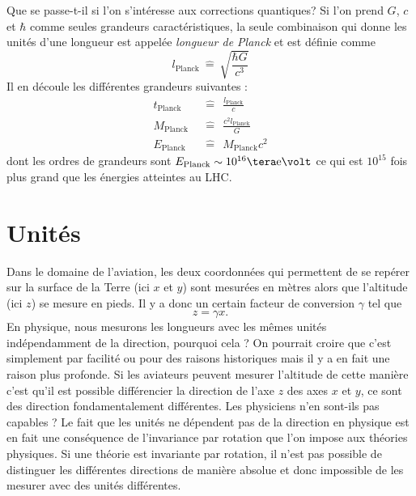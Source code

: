 \documentclass[a4paper,11pt]{report}
\begin{document}
        Que se passe-t-il si l'on s'intéresse aux corrections quantiques? Si l'on prend $G$, $c$ et $\hbar$ comme seules grandeurs caractéristiques, la seule combinaison qui donne les unités d'une longueur est appelée \textit{longueur de Planck} et est définie comme
        \begin{equation*}
            l_{\text{Planck}} ~\hat{=}~ \sqrt{\frac{\hbar G}{c^3}}
        \end{equation*}
        Il en découle les différentes grandeurs suivantes :
        \begin{align*}
            t_{\text{Planck}} ~&~\hat{=}~~ \frac{l_{\text{Planck}}}{c} \\
            M_{\text{Planck}} ~&~\hat{=}~~ \frac{c^2l_{\text{Planck}}}{G} \\
            E_{\text{Planck}} ~&~\hat{=}~~ M_{\text{Planck}}c^2
        \end{align*}
        dont les ordres de grandeurs sont $E_{\text{Planck}}\sim10^{16}\tera\text{e}\volt$ ce qui est $10^{15}$ fois plus grand que les énergies atteintes au LHC.
        
    \section{Unités}
    
        Dans le domaine de l'aviation, les deux coordonnées qui permettent de se repérer sur la surface de la Terre (ici $x$ et $y$) sont mesurées en mètres alors que l'altitude (ici $z$) se mesure en pieds. Il y a donc un certain facteur de conversion $\gamma$ tel que 
        \begin{equation}
            z = \gamma x.
        \end{equation}
        En physique, nous mesurons les longueurs avec les mêmes unités indépendamment de la direction, pourquoi cela ? On pourrait croire que c'est simplement par facilité ou pour des raisons historiques mais il y a en fait une raison plus profonde. Si les aviateurs peuvent mesurer l'altitude de cette manière c'est qu'il est possible différencier la direction de l'axe $z$ des axes $x$ et $y$, ce sont des direction fondamentalement différentes. Les physiciens n'en sont-ils pas capables ? Le fait que les unités ne dépendent pas de la direction en physique est en fait une conséquence de l'invariance par rotation que l'on impose aux théories physiques. Si une théorie est invariante par rotation, il n'est pas possible de distinguer les différentes directions de manière absolue et donc impossible de les mesurer avec des unités différentes.
        
\end{document}
